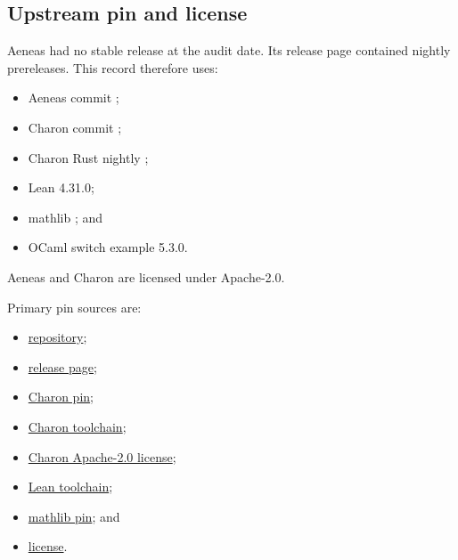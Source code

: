 \documentclass[11pt]{article}
\begin{document}
\subsection{Upstream pin and license}

Aeneas had no stable release at the audit date.  Its release page contained nightly prereleases.
This record therefore uses:
\begin{itemize}[leftmargin=*]
  \item Aeneas commit
  \href{https://github.com/AeneasVerif/aeneas/commit/6e167c9b63a4dafd66d0e0edd9d94669f957ff7b}
  {};
  \item Charon commit ;
  \item Charon Rust nightly ;
  \item Lean 4.31.0;
  \item mathlib ; and
  \item OCaml switch example 5.3.0.
\end{itemize}

Aeneas and Charon are licensed under Apache-2.0.

Primary pin sources are:
\begin{itemize}[leftmargin=*]
  \item \href{https://github.com/AeneasVerif/aeneas}{repository};
  \item \href{https://github.com/AeneasVerif/aeneas/releases}{release page};
  \item
  \href{https://raw.githubusercontent.com/AeneasVerif/aeneas/6e167c9b63a4dafd66d0e0edd9d94669f957ff7b/charon-pin}
  {Charon pin};
  \item
  \href{https://raw.githubusercontent.com/AeneasVerif/charon/527ea8e3b5dcb52edd6aef0f7bc34cc09c11dd59/charon/rust-toolchain}
  {Charon toolchain};
  \item
  \href{https://raw.githubusercontent.com/AeneasVerif/charon/527ea8e3b5dcb52edd6aef0f7bc34cc09c11dd59/LICENSE.md}
  {Charon Apache-2.0 license};
  \item
  \href{https://raw.githubusercontent.com/AeneasVerif/aeneas/6e167c9b63a4dafd66d0e0edd9d94669f957ff7b/backends/lean/lean-toolchain}
  {Lean toolchain};
  \item
  \href{https://raw.githubusercontent.com/AeneasVerif/aeneas/6e167c9b63a4dafd66d0e0edd9d94669f957ff7b/backends/lean/lakefile.lean}
  {mathlib pin}; and
  \item
  \href{https://raw.githubusercontent.com/AeneasVerif/aeneas/6e167c9b63a4dafd66d0e0edd9d94669f957ff7b/LICENSE.md}
  {license}.
\end{itemize}
\end{document}
